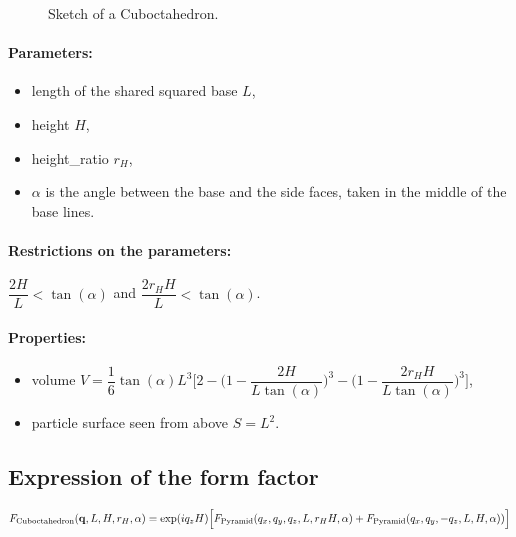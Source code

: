 \begin{figure}[ht]
\begin{center}
\caption{Sketch of a Cuboctahedron.}
\end{center}
\label{cuboctahedron}
\end{figure}

\paragraph{Parameters:}
\begin{itemize}
\item length of the shared squared base $L$,
\item height $H$,
\item height\_ratio $r_H$,
\item $\alpha$ is the angle between the base and the
  side faces, taken in the middle of the base lines.
\end{itemize}

\paragraph{Restrictions on the parameters:} $\dfrac{2H}{L}< \tan(\alpha)$ and $\dfrac{2r_HH}{L}< \tan(\alpha)$.

\paragraph{Properties:}
\begin{itemize}
\item volume $ V= \dfrac{1}{6} \tan(\alpha)L^3 \Big[ 2
         - \Big(1 - \dfrac{2H }{L\tan(\alpha)} \Big)^3
           - \Big(1 - \dfrac{2 r_H
             H}{L\tan(\alpha) }\Big)^3\Big]$,
\item particle surface seen from above $S =L^2$.
\end{itemize}

\subsection{Expression of the form factor}
\begin{equation*}
F_{\rm{Cuboctahedron}}(\mathbf{q}, L, H, r_H, \alpha)=\exp(iq_z
H)\Big[F_{\rm{Pyramid}}(q_x,q_y, q_z, L, r_H H,
\alpha)+F_{\rm{Pyramid}}(q_x, q_y, -q_z, L, H, \alpha))\Big]
\end{equation*}

